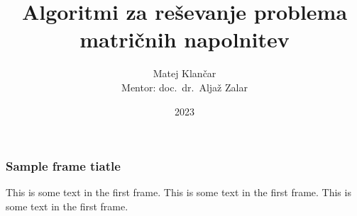 \documentclass{beamer}
\title{Algoritmi za reševanje problema matričnih napolnitev}
\author[Matej Klančar]{Matej Klančar \\ \vspace{0.2cm} Mentor: doc.\ dr.\ Aljaž Zalar}
\date{2023}
\begin{document}
\frame{\titlepage}

\begin{frame}
\frametitle{Sample frame tiatle}
This is some text in the first frame. This is some text in the first frame. This is some text in the first frame.
\end{frame}
\end{document}
